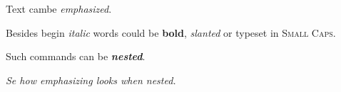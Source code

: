\documentclass{article}
\begin{document}
  Text cambe \emph{emphasized}.

  Besides begin \textit{italic} words could be \textbf{bold},
  \textsl{slanted} or typeset in \textsc{Small Caps}.

  Such commands can be \textit{\textbf{nested}}.

  \emph{Se how \emph{emphasizing} looks when nested.}
\end{document}
